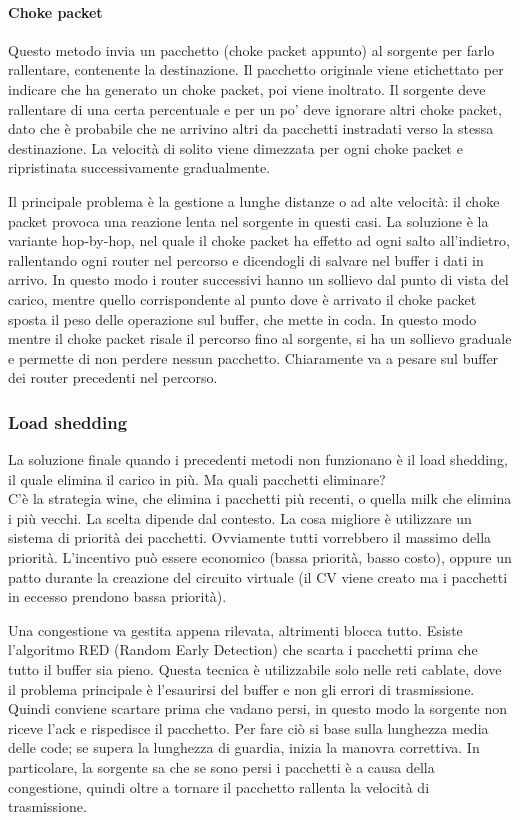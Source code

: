 \paragraph{Choke packet}
Questo metodo invia un pacchetto (choke packet appunto) al sorgente per farlo rallentare, contenente la destinazione.
Il pacchetto originale viene etichettato per indicare che ha generato un choke packet, poi viene inoltrato.
Il sorgente deve rallentare di una certa percentuale e per un po' deve ignorare altri choke packet, dato che è probabile che ne arrivino altri da pacchetti instradati verso la stessa destinazione.
La velocità di solito viene dimezzata per ogni choke packet e ripristinata successivamente gradualmente.

Il principale problema è la gestione a lunghe distanze o ad alte velocità: il choke packet provoca una reazione lenta nel sorgente in questi casi.
La soluzione è la variante hop-by-hop, nel quale il choke packet ha effetto ad ogni salto all'indietro, rallentando ogni router nel percorso e dicendogli di salvare nel buffer i dati in arrivo.
In questo modo i router successivi hanno un sollievo dal punto di vista del carico, mentre quello corrispondente al punto dove è arrivato il choke packet sposta il peso delle operazione sul buffer, che mette in coda.
In questo modo mentre il choke packet risale il percorso fino al sorgente, si ha un sollievo graduale e permette di non perdere nessun pacchetto. 
Chiaramente va a pesare sul buffer dei router precedenti nel percorso.

\subsubsection{Load shedding}
La soluzione finale quando i precedenti metodi non funzionano è il load shedding, il quale elimina il carico in più.
Ma quali pacchetti eliminare?\\
C'è la strategia wine, che elimina i pacchetti più recenti, o quella milk che elimina i più vecchi.
La scelta dipende dal contesto.
La cosa migliore è utilizzare un sistema di priorità dei pacchetti. 
Ovviamente tutti vorrebbero il massimo della priorità.
L'incentivo può essere economico (bassa priorità, basso costo), oppure un patto durante la creazione del circuito virtuale (il CV viene creato ma i pacchetti in eccesso prendono bassa priorità).

Una congestione va gestita appena rilevata, altrimenti blocca tutto.
Esiste l'algoritmo RED (Random Early Detection) che scarta i pacchetti prima che tutto il buffer sia pieno.
Questa tecnica è utilizzabile solo nelle reti cablate, dove il problema principale è l'esaurirsi del buffer e non gli errori di trasmissione.
Quindi conviene scartare prima che vadano persi, in questo modo la sorgente non riceve l'ack e rispedisce il pacchetto.
Per fare ciò si base sulla lunghezza media delle code; se supera la lunghezza di guardia, inizia la manovra correttiva.
In particolare, la sorgente sa che se sono persi i pacchetti è a causa della congestione, quindi oltre a tornare il pacchetto rallenta la velocità di trasmissione.

